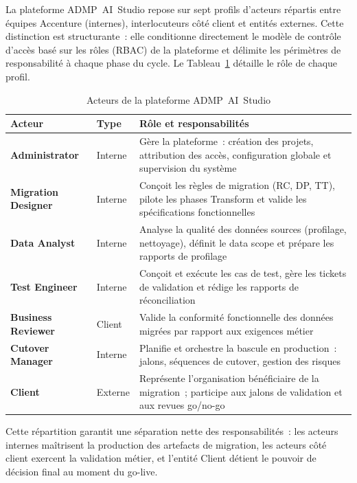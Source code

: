 La plateforme ADMP~AI~Studio repose sur sept profils d'acteurs répartis entre équipes Accenture (internes), interlocuteurs côté client et entités externes. Cette distinction est structurante~: elle conditionne directement le modèle de contrôle d'accès basé sur les rôles (RBAC) de la plateforme et délimite les périmètres de responsabilité à chaque phase du cycle. Le Tableau~\ref{tab:acteurs} détaille le rôle de chaque profil.

\begin{table}[H]
\centering
\caption{Acteurs de la plateforme ADMP~AI~Studio}
\label{tab:acteurs}
\begin{tabularx}{\textwidth}{llX}
\toprule
\textbf{Acteur} & \textbf{Type} & \textbf{Rôle et responsabilités} \\
\midrule
\textbf{Administrator} & Interne &
  Gère la plateforme~: création des projets, attribution des accès, configuration globale et supervision du système \\
\addlinespace
\textbf{Migration Designer} & Interne &
  Conçoit les règles de migration (RC, DP, TT), pilote les phases Transform et valide les spécifications fonctionnelles \\
\addlinespace
\textbf{Data Analyst} & Interne &
  Analyse la qualité des données sources (profilage, nettoyage), définit le data scope et prépare les rapports de profilage \\
\addlinespace
\textbf{Test Engineer} & Interne &
  Conçoit et exécute les cas de test, gère les tickets de validation et rédige les rapports de réconciliation \\
\addlinespace
\textbf{Business Reviewer} & Client &
  Valide la conformité fonctionnelle des données migrées par rapport aux exigences métier \\
\addlinespace
\textbf{Cutover Manager} & Interne &
  Planifie et orchestre la bascule en production~: jalons, séquences de cutover, gestion des risques \\
\addlinespace
\textbf{Client} & Externe &
  Représente l'organisation bénéficiaire de la migration~; participe aux jalons de validation et aux revues go/no-go \\
\bottomrule
\end{tabularx}
\end{table}

Cette répartition garantit une séparation nette des responsabilités~: les acteurs internes maîtrisent la production des artefacts de migration, les acteurs côté client exercent la validation métier, et l'entité Client détient le pouvoir de décision final au moment du go-live.

